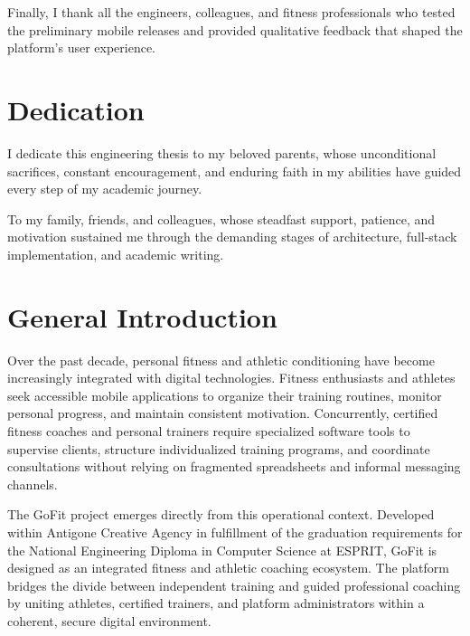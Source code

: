 \documentclass[12pt,a4paper,openany]{report}
\begin{document}
Finally, I thank all the engineers, colleagues, and fitness professionals who tested the preliminary mobile releases and provided qualitative feedback that shaped the platform's user experience.


\chapter*{Dedication}

I dedicate this engineering thesis to my beloved parents, whose unconditional sacrifices, constant encouragement, and enduring faith in my abilities have guided every step of my academic journey.


To my family, friends, and colleagues, whose steadfast support, patience, and motivation sustained me through the demanding stages of architecture, full-stack implementation, and academic writing.


\renewcommand{\contentsname}{Table Of Contents}
\clearpage\tableofcontents\clearpage\begingroup{}\listoftables\endgroup\clearpage\listoffigures\clearpage
\chapter*{General Introduction}


{}

Over the past decade, personal fitness and athletic conditioning have become increasingly integrated with digital technologies. Fitness enthusiasts and athletes seek accessible mobile applications to organize their training routines, monitor personal progress, and maintain consistent motivation. Concurrently, certified fitness coaches and personal trainers require specialized software tools to supervise clients, structure individualized training programs, and coordinate consultations without relying on fragmented spreadsheets and informal messaging channels.

The GoFit project emerges directly from this operational context. Developed within Antigone Creative Agency in fulfillment of the graduation requirements for the National Engineering Diploma in Computer Science at ESPRIT, GoFit is designed as an integrated fitness and athletic coaching ecosystem. The platform bridges the divide between independent training and guided professional coaching by uniting athletes, certified trainers, and platform administrators within a coherent, secure digital environment.
\end{document}

